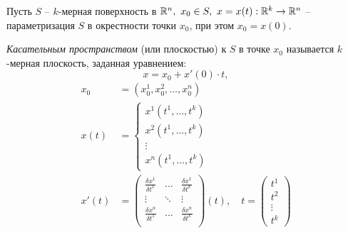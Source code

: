 \begin{definition}
    Пусть $ S $ -- $ k $-мерная поверхность в $ \mathbb{R}^n, \ x_0 \in S, \ x = x(t):\mathbb{R}^k \rightarrow \mathbb{R}^n $ -- параметризация $ S $ в окрестности точки $ x_0 $, при этом $ x_0 = x(0) $.

    \emph{Касательным пространством} (или плоскостью) к $S$ в точке $x_0$ называется $k$-мерная плоскость, заданная уравнением:
    \begin{equation}\label{eq:8}
        x = x_0 + x'(0) \cdot t,
    \end{equation}
    \begin{align*}
        x_0   & = (x^1_0,x^2_0,\ldots,x^n_0)                                                   \\
        x(t)  & = \left\{\begin{array}{l}
                             x^1(t^1,\ldots,t^k) \\
                             x^2(t^1,\ldots,t^k) \\
                             \vdots              \\
                             x^n(t^1,\ldots,t^k)
                         \end{array}\right.                                                   \\
        x'(t) & = \left(\begin{matrix}
                                \frac{\delta x^1}{\delta t^1} & \ldots & \frac{\delta x^1}{\delta t^k} \\
                                \vdots                        & \ddots & \vdots                        \\
                                \frac{\delta x^n}{\delta t^1} & \ldots & \frac{\delta x^n}{\delta t^k} \\
                            \end{matrix}\right)(t), \quad t = \left(\begin{matrix}
                                                                        t^1 \\ t^2 \\ \vdots \\ t^k
                                                                    \end{matrix}\right)
    \end{align*}


\end{definition}
